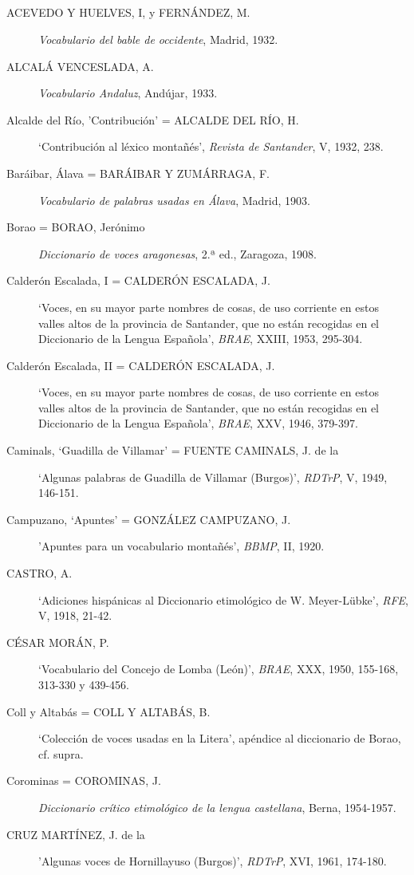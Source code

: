 \subsection{} \begin{description}
\item[ACEVEDO Y HUELVES, I, y FERNÁNDEZ, M.] \textit{Vocabulario del bable de occidente}, Madrid, 1932.
\item[ALCALÁ VENCESLADA, A.] \textit{Vocabulario Andaluz}, Andújar, 1933.
\item[Alcalde del Río, 'Contribución' = ALCALDE DEL RÍO, H.] `Contribución al léxico montañés', \textit{Revista de Santander}, V, 1932, 238.
\item[Baráibar, Álava = BARÁIBAR Y ZUMÁRRAGA, F.] \textit{Vocabulario de palabras usadas en Álava}, Madrid, 1903.
\item[Borao = BORAO, Jerónimo] \textit{Diccionario de voces aragonesas}, 2.ª ed., Zaragoza, 1908.
\item[Calderón Escalada, I = CALDERÓN ESCALADA, J.] `Voces, en su mayor parte nombres de cosas, de uso corriente en estos valles altos de la provincia de Santander, que no están recogidas en el Diccionario de la Lengua Española', \textit{BRAE}, XXIII, 1953, 295-304. 
\item[Calderón Escalada, II = CALDERÓN ESCALADA, J.] `Voces, en su mayor parte nombres de cosas, de uso corriente en estos valles altos de la provincia de Santander, que no están recogidas en el Diccionario de la Lengua Española', \textit{BRAE}, XXV, 1946, 379-397.
\item[Caminals, `Guadilla de Villamar' = FUENTE CAMINALS, J. de la] `Algunas palabras de Guadilla de Villamar (Burgos)', \textit{RDTrP}, V, 1949, 146-151.
\item[Campuzano, `Apuntes' = GONZÁLEZ CAMPUZANO, J.] 'Apuntes para un vocabulario montañés', \textit{BBMP}, II, 1920. 
\item[CASTRO, A.] `Adiciones hispánicas al Diccionario etimológico de W. Meyer-Lübke', \textit{RFE}, V, 1918, 21-42.
\item[CÉSAR MORÁN, P.] `Vocabulario del Concejo de Lomba (León)', \textit{BRAE}, XXX, 1950, 155-168, 313-330 y 439-456.
\item[Coll y Altabás =  COLL Y ALTABÁS, B.] `Colección de voces usadas en la Litera', apéndice al diccionario de Borao, cf. supra. 
\item[Corominas = COROMINAS, J.] \textit{Diccionario crítico etimológico de la lengua castellana}, Berna, 1954-1957.
\item[CRUZ MARTÍNEZ, J. de la] 'Algunas voces de Hornillayuso (Burgos)',  \textit{RDTrP}, XVI, 1961, 174-180.

\end{description}
